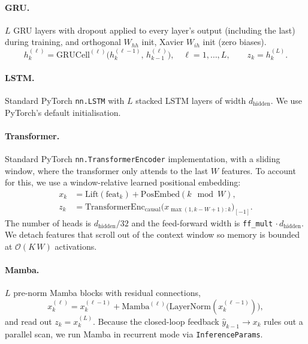 \paragraph{GRU.} $L$ GRU layers with dropout applied to every layer's
output (including the last) during training, and orthogonal $W_{hh}$ init, Xavier $W_{ih}$ init (zero biases). 
\begin{equation}
h^{(\ell)}_k = \mathrm{GRUCell}^{(\ell)}\!\big(h^{(\ell-1)}_k,\, h^{(\ell)}_{k-1}\big), \quad \ell=1,\dots,L, \qquad z_k = h^{(L)}_k.
\end{equation}

\paragraph{LSTM.}  Standard PyTorch
\texttt{nn.LSTM} with $L$ stacked LSTM layers of width
$d_{\mathrm{hidden}}$. We use PyTorch's default initialisation.

\paragraph{Transformer.} Standard PyTorch \texttt{nn.TransformerEncoder} implementation, with a sliding window, where the transformer only attends to the last $W$ features. To account for this, we use a window-relative learned positional embedding:
\begin{align}
x_k &= \mathrm{Lift}(\mathrm{feat}_k) + \mathrm{PosEmbed}(k\!\!\mod\!\!W), \\
z_k &= \mathrm{TransformerEnc}_{\mathrm{causal}}\!\big(x_{\max(1,k-W+1):k}\big)_{[-1]}.
\end{align}
The number of heads is $d_{\mathrm{hidden}}/32$ and the feed-forward width is
\texttt{ff\_mult}$\,\cdot d_{\mathrm{hidden}}$. We detach features that scroll
out of the context window so memory is bounded at
$\mathcal{O}(K\,W)$ activations.

\paragraph{Mamba.} $L$ pre-norm Mamba blocks with residual
connections,
\begin{equation}
x^{(\ell)}_k = x^{(\ell-1)}_k + \mathrm{Mamba}^{(\ell)}\!\big(\mathrm{LayerNorm}(x^{(\ell-1)}_k)\big),
\end{equation}
and read out $z_k = x^{(L)}_k$. Because the closed-loop feedback
$\hat{y}_{k-1}\!\to\!x_k$ rules out a parallel scan, we run Mamba in
recurrent mode via \texttt{InferenceParams}.

